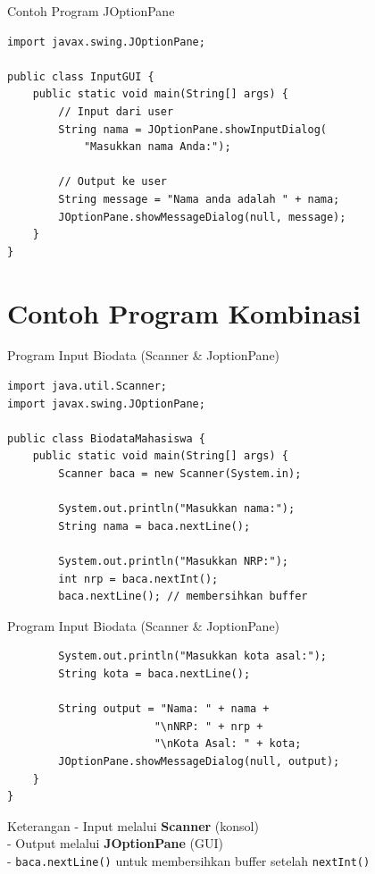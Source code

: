 \documentclass{beamer}
\begin{document}
\begin{frame}[fragile]{Contoh Program JOptionPane}
\begin{lstlisting}
import javax.swing.JOptionPane;

public class InputGUI {
    public static void main(String[] args) {
        // Input dari user
        String nama = JOptionPane.showInputDialog(
            "Masukkan nama Anda:");
        
        // Output ke user
        String message = "Nama anda adalah " + nama;
        JOptionPane.showMessageDialog(null, message);
    }
}
\end{lstlisting}
\end{frame}

\section{Contoh Program Kombinasi}
\begin{frame}[fragile]{Program Input Biodata (Scanner \& JoptionPane)}
\begin{lstlisting}
import java.util.Scanner;
import javax.swing.JOptionPane;

public class BiodataMahasiswa {
    public static void main(String[] args) {
        Scanner baca = new Scanner(System.in);
        
        System.out.println("Masukkan nama:");
        String nama = baca.nextLine();
        
        System.out.println("Masukkan NRP:");
        int nrp = baca.nextInt();
        baca.nextLine(); // membersihkan buffer
\end{lstlisting}
\end{frame}
\begin{frame}[fragile]{Program Input Biodata (Scanner \& JoptionPane)}
\begin{lstlisting}
        System.out.println("Masukkan kota asal:");
        String kota = baca.nextLine();
        
        String output = "Nama: " + nama + 
                       "\nNRP: " + nrp + 
                       "\nKota Asal: " + kota;
        JOptionPane.showMessageDialog(null, output);
    }
}
\end{lstlisting}

\begin{block}{Keterangan}
- Input melalui \textbf{Scanner} (konsol)\\
- Output melalui \textbf{JOptionPane} (GUI)\\
- \texttt{baca.nextLine()} untuk membersihkan buffer setelah \texttt{nextInt()}
\end{block}
\end{frame}
\end{document}
